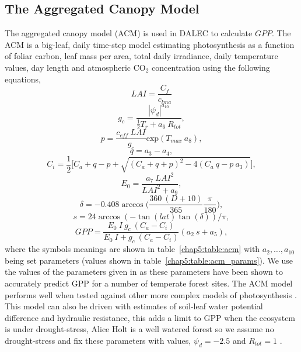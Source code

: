 \subsection{The Aggregated Canopy Model} \label{chap5:sec:ACM}
The aggregated canopy model (ACM) is used in DALEC to calculate $GPP$. The ACM is a big-leaf, daily time-step model estimating photosynthesis as a function of foliar carbon, leaf mass per area, total daily irradiance, daily temperature values, day length and atmospheric CO\(_{2}\) concentration using the following equations,
\begin{equation}
LAI = \frac{C_f}{c_{lma}} 
\end{equation}
\begin{equation} 
g_c = \frac{|\psi_d|^{a_{10}}}{\frac{1}{2}T_r + a_6~R_{tot}},
\end{equation}
\begin{equation}
p = \frac{c_{eff}~LAI}{g_c}\text{exp}(T_{max}~a_8),
\end{equation}
\begin{equation}
q = a_3 - a_4,
\end{equation}
\begin{equation}
C_i = \frac{1}{2}\bigg[C_a + q - p + \sqrt{(C_a + q + p)^{2} - 4(C_a~q - p~a_3)} \bigg],
\end{equation}
\begin{equation}
E_0 = \frac{a_7~LAI^2}{LAI^2 + a_9},
\end{equation}
\begin{equation}
\delta = -0.408\arccos\bigg(\frac{360~(D+10)}{365}\frac{\pi}{180}\bigg),
\end{equation}
\begin{equation}
s = 24\arccos(-\tan(lat)\tan(\delta))/\pi,
\end{equation}
\begin{equation}
GPP = \frac{E_0~I~g_c~(C_a-C_i)}{E_0~I + g_c~(C_a-C_i)}(a_2~s + a_5),
\end{equation}
where the symbols meanings are shown in table~\ref{chap5:table:acm} with $a_2,\dots ,a_{10}$ being set parameters (values shown in table~\ref{chap5:table:acm_params}). We use the values of the parameters given in \citet{fox2009reflex} as these parameters have been shown to accurately predict GPP for a number of temperate forest sites. The ACM model performs well when tested against other more complex models of photosynthesis \citep{williams1997predicting}. This model can also be driven with estimates of soil-leaf water potential difference and hydraulic resistance, this adds a limit to GPP when the ecosystem is under drought-stress, Alice Holt is a well watered forest so we assume no drought-stress and fix these parameters with values, \(\psi_d = -2.5\) and \(R_{tot} = 1\) \citep{fox2009reflex}.
